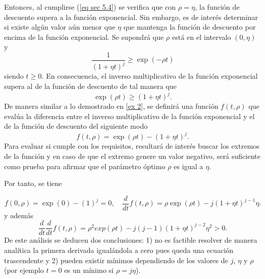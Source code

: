 Entonces, al cumplirse (\ref{eq sec 5.4}) se verifica que con $\rho = \eta$, la función de descuento supera a la función exponencial. Sin embargo, es de interés  determinar si existe algún valor aún menor que $\eta$ que mantenga la función de descuento por encima de la función exponencial. Se supondrá que $\rho$ está en el intervalo $(0, \eta)$ y
%
$$\dfrac{1}{(1+\eta t)^j} \geq \exp(-\rho t)$$
siendo $t\geq 0$. En consecuencia, el inverso multiplicativo de la función exponencial supera al de la función de descuento de tal manera que 
$$ \exp(\rho t)\geq (1+\eta t)^j.$$
%
De manera similar a lo demostrado en \ref{ex 2}, se definirá una función $f(t,\rho)$ que evalúa la diferencia entre el inverso multiplicativo de la función exponencial y el de la función de descuento del siguiente modo
%
$$f(t,\rho)=\exp(\rho t)-(1+\eta t)^j.$$
%
Para evaluar si cumple con los requisitos, resultará de interés buscar los extremos de la función y en caso de que el extremo genere un valor negativo, será suficiente como prueba para afirmar que el parámetro óptimo $\rho$ es igual a $\eta$.

Por tanto, se tiene

$$f(0,\rho)=\exp(0)-(1)^j=0, \quad 
\dfrac{d}{dt}f(t,\rho)=\rho\exp(\rho t)-j(1+\eta t)^{j-1}\eta.$$
y además
$$\dfrac{d}{dt} \dfrac{d}{dt}f(t,\rho)=\rho^2 exp(\rho t)-j (j-1)(1+\eta t)^{j-2}\eta^2>0 .$$
%
De este análisis se deducen dos conclusiones: 1) no es factible resolver de manera analítica la primera derivada igualándola a cero pues queda una ecuación trascendente y 2) pueden existir mínimos dependiendo de los valores de $j$, $\eta$ y $\rho$ (por ejemplo $t=0$ es un mínimo si $\rho=j \eta$). 



